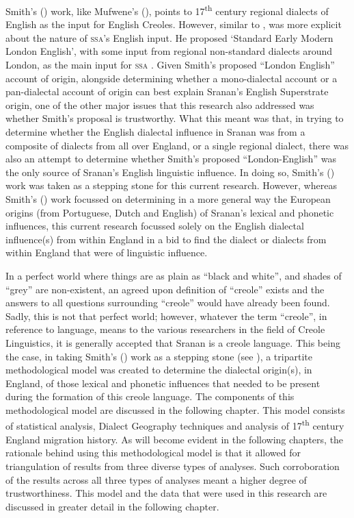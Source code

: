 Smith's (\citeyear{Smith87}) work, like Mufwene's (\citeyear{Mufwene01}), points to 17\textsuperscript{th} century regional dialects of English as the input for English Creoles. However, similar to \citet{Chaudenson79}, \citet{Smith87} was more explicit about the nature of \textsc{ssa}'s English input. He proposed `Standard Early Modern London English', with some input from regional non-standard dialects around London, as the main input for \textsc{ssa} \citep{Smith08, Smith87}. Given Smith's proposed ``London English'' account of origin, alongside determining whether a mono-dialectal account or a pan-dialectal account of origin can best explain Sranan's English Superstrate origin, one of the other major issues that this research also addressed was whether Smith's proposal is trustworthy. What this meant was that, in trying to determine whether the English dialectal influence in Sranan was from a composite of dialects \citep{Mufwene08, Mufwene01} from all over England, or a single regional dialect, there was also an attempt to determine whether Smith's proposed ``London-English'' was the only source of Sranan's English linguistic influence. In doing so, Smith's (\citeyear{Smith87}) work was taken as a stepping stone for this current research. However, whereas Smith's (\citeyear{Smith87}) work focussed on determining in a more general way the European origins (from Portuguese, Dutch and English) of Sranan's lexical and phonetic influences, this current research focussed solely on the English dialectal influence(s) from within England in a bid to find the dialect or dialects from within England that were of linguistic influence.

In a perfect world where things are as plain as ``black and white'', and shades of  ``grey'' are non-existent, an agreed upon definition of ``creole'' exists and the answers to all questions surrounding ``creole'' would have already been found. Sadly, this is not that perfect world; however, whatever the term ``creole'', in reference to language, means to the various researchers in the field of Creole Linguistics, it is generally accepted that Sranan is a creole language. This being the case, in taking Smith's (\citeyear{Smith87}) work as a stepping stone (see ), a tripartite methodological model was created to determine the dialectal origin(s), in England, of those lexical and phonetic influences that needed to be present during the formation of this creole language. The components of this methodological model are discussed in the following chapter. This model consists of statistical analysis, Dialect Geography techniques and analysis of 17\textsuperscript{th} century England migration history. As will become evident in the following chapters, the rationale behind using this methodological model is that it allowed for triangulation of results from three diverse types of analyses. Such corroboration of the results across all three types of analyses meant a higher degree of trustworthiness. This model and the data that were used in this research are discussed in greater detail in the following chapter.
 
